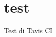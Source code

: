 \documentclass[a4paper,11pt]{report}
\begin{document}
	\chapter{test}
		Test di Tavis CI
\end{document}
